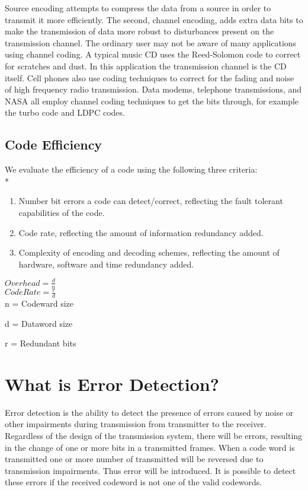 \documentclass[12pt,a4paper]{report}
\begin{document}
 Source encoding attempts to compress the data from a source in order to transmit it more efficiently. The second, channel encoding, adds extra data bits to make the transmission of data more robust to disturbances present on the transmission channel. The ordinary user may not be aware of many applications using channel coding. A typical music CD uses the Reed-Solomon code to correct for scratches and dust. In this application the transmission channel is the CD itself. Cell phones also use coding techniques to correct for the fading and noise of high frequency radio transmission. Data modems, telephone transmissions, and NASA all employ channel coding techniques to get the bits through, for example the turbo code and LDPC codes.
 
 \subsection{Code Efficiency}
 We evaluate the efficiency of a code using the following three criteria\cite{Dubrova}:\\*
 \begin{enumerate}
\item Number bit errors a code can detect/correct, reflecting the fault tolerant capabilities of the code.
\item Code rate, reflecting the amount of information redundancy added.
\item Complexity of encoding and decoding schemes, reflecting the amount of hardware, software and time redundancy added.
 \end{enumerate}
 
$Overhead = \frac{d}{n}$\\

$Code Rate = \frac{r}{d}$\\
 
 n = Codeward size
 
 d = Dataword size
 
 r = Redundant bits
 
 \section{What is Error Detection?}
 Error detection is the ability to detect the presence of errors caused by noise or other impairments during transmission from transmitter to the receiver.\\
 
 Regardless of the design of the transmission system, there will be errors, resulting in the change of one or more bits in a transmitted frames. When a code word is transmitted one or more number
 of transmitted will be reversed due to transmission impairments. Thus error will be introduced. It is possible to detect these errors if the received codeword is not one of the valid codewords.\\
 
\end{document}
